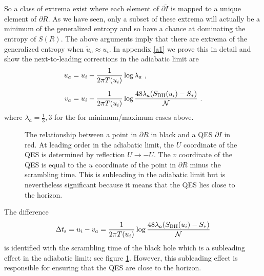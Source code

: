 \documentclass[12pt]{article}
\newcommand\SBH{S_\text{BH}}
\newcommand{\EQ}[1]{\begin{equation}\begin{split} #1
\end{split}\end{equation}}
\begin{document}
So a class of extrema exist where each element of $\partial\tilde I$ is mapped to a unique element of $\partial R$. As we have seen, only a subset of these extrema will actually be a minimum of the generalized entropy and so have a chance at dominating the entropy of $S(R)$. The above arguments imply that there are extrema of the generalized entropy when $\tilde u_a\approx u_i$. In appendix \ref{a1} we prove this in detail and show the next-to-leading corrections in the adiabatic limit are
\EQ{
u_a&=u_i-\frac1{2\pi T(u_i)}\log\lambda_a\ ,\\[5pt] v_a&=u_i-\frac1{2\pi T(u_i)}\log\frac{48\lambda_a(\SBH (u_i)-S_*)}{\cal N}\ .
\label{ono}
}
where $\lambda_a=\frac13,3$ for the for minimum/maximum cases above. 
\begin{figure}[ht]
\begin{center}
\caption{\footnotesize The relationship between a point in $\partial R$ in black and a QES $\partial I$ in red. At leading order in the adiabatic limit, the $U$ coordinate of the QES is determined by reflection $U\to-U$. The $v$ coordinate of the QES is equal to the $u$ coordinate of the point in $\partial R$ minus the scrambling time. This is subleading in the adiabatic limit but is nevertheless significant because it means that the QES lies close to the horizon.}
\label{fig4} 
\end{center}
\end{figure}

The difference 
\EQ{
\Delta t_\text{s}=u_i-v_a=\frac1{2\pi T(u_i)}\log\frac{48\lambda_a(\SBH (u_i)-S_*)}{\cal N}
}
is identified with the scrambling time of the black hole which is a subleading effect in the adiabatic limit: see figure \ref{fig4}. However, this subleading effect is responsible for ensuring that the QES are close to the horizon.
\end{document}
